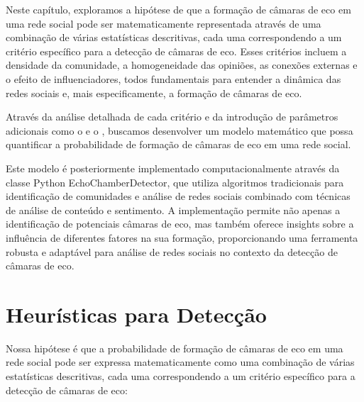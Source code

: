 Neste capítulo, exploramos a hipótese de que a formação de câmaras de eco em uma rede social pode ser matematicamente representada através de uma combinação de várias estatísticas descritivas, cada uma correspondendo a um critério específico para a detecção de câmaras de eco. Esses critérios incluem a densidade da comunidade, a homogeneidade das opiniões, as conexões externas e o efeito de influenciadores, todos fundamentais para entender a dinâmica das redes sociais e, mais especificamente, a formação de câmaras de eco.

Através da análise detalhada de cada critério e da introdução de parâmetros adicionais como o  e o , buscamos desenvolver um modelo matemático que possa quantificar a probabilidade de formação de câmaras de eco em uma rede social.

Este modelo é posteriormente implementado computacionalmente através da classe Python EchoChamberDetector, que utiliza algoritmos tradicionais para identificação de comunidades e análise de redes sociais combinado com técnicas de análise de conteúdo e sentimento. A implementação permite não apenas a identificação de potenciais câmaras de eco, mas também oferece insights sobre a influência de diferentes fatores na sua formação, proporcionando uma ferramenta robusta e adaptável para análise de redes sociais no contexto da detecção de câmaras de eco.

\section{Heurísticas para Detecção}

Nossa hipótese é que a probabilidade de formação de câmaras de eco em uma rede social pode ser expressa matematicamente como uma combinação de várias estatísticas descritivas, cada uma correspondendo a um critério específico para a detecção de câmaras de eco:

